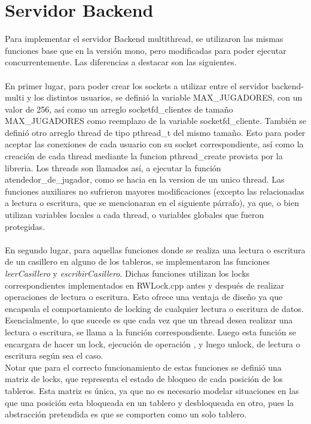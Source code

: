 \section{Servidor Backend}
Para implementar el servidor Backend multithread, se utilizaron las mismas funciones base que en la versión mono, pero modificadas para poder ejecutar concurrentemente. Las diferencias a destacar son las siguientes.
\\
\\
En primer lugar, para poder crear los sockets a utilizar entre el servidor backend-multi y los distintos usuarios, se definió la variable MAX_JUGADORES, con un valor de 256, así como un arreglo socketfd_clientes de tamaño MAX_JUGADORES como reemplazo de la variable  socketfd_cliente.
También se definió otro arreglo thread de tipo pthread_t del mismo tamaño. Esto para poder aceptar las conexiones de cada usuario con su socket correspondiente, así como la creación de cada thread mediante la funcion pthread_create provista por la libreria. Los threads son llamados así, a ejecutar la función atendedor_de_jugador, como se hacia en la version de un unico thread. Las funciones auxiliares no sufrieron mayores modificaciones (excepto las relacionadas a lectura o escritura, que se mencionaran en el siguiente párrafo), ya que, o bien utilizan variables locales a cada thread, o variables globales que fueron protegidas.
\\
\\
En segundo lugar, para aquellas funciones donde se realiza una lectura  o escritura de un casillero en alguno de los tableros, se implementaron las funciones \emph{leerCasillero} y \emph{escribirCasillero}. Dichas funciones utilizan los locks correspondientes  implementados en RWLock.cpp antes y después de realizar operaciones de lectura o escritura. Esto ofrece una ventaja de diseño ya que encapsula el comportamiento de locking de cualquier lectura o escritura de datos. Esencialmente, lo que sucede es que cada vez que un thread desea realizar una lectura o escritura, se llama a la función correspondiente. Luego esta función se encargara de hacer un lock, ejecución de operación , y luego unlock, de lectura o escritura según sea el caso. \\
Notar que para el correcto funcionamiento de estas funciones se definió una matriz de locks, que representa el estado de bloqueo de cada posición de los tableros. Esta matriz es única, ya que no es necesario modelar situaciones en las que una posición esta bloqueada en un tablero y desbloqueada en otro, pues la abstracción pretendida es que se comporten como un solo tablero.\\
